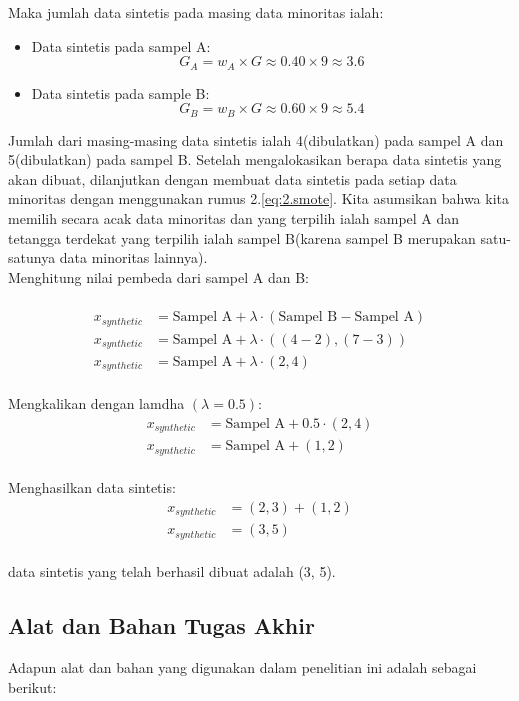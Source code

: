 Maka jumlah data sintetis pada masing data minoritas ialah:
\begin{itemize}
	\item Data sintetis pada sampel A:\\
		$$
			G_A = w_A \times G \approx 0.40 \times 9 \approx 3.6 
		$$
	\item Data sintetis pada sample B:\\
		$$
			G_B = w_B \times G \approx 0.60 \times 9 \approx 5.4 
		$$
\end{itemize}
Jumlah dari masing-masing data sintetis ialah 4(dibulatkan) pada sampel A dan 5(dibulatkan) pada sampel B. Setelah mengalokasikan berapa data sintetis yang akan dibuat, dilanjutkan dengan membuat data sintetis pada setiap data minoritas dengan menggunakan rumus 2.\ref{eq:2.smote}. Kita asumsikan bahwa kita memilih secara acak data minoritas dan yang terpilih ialah sampel A dan tetangga terdekat yang terpilih ialah sampel B(karena sampel B merupakan satu-satunya data minoritas lainnya).\\
Menghitung nilai pembeda dari sampel A dan B:\\
\\
\begin{align*}
    x_{synthetic} &= \text{Sampel A} + \lambda \cdot (\text{Sampel B} - \text{Sampel A})   \\
    x_{synthetic} &= \text{Sampel A} + \lambda \cdot ((4-2), (7-3)) \\
    x_{synthetic} &= \text{Sampel A} + \lambda \cdot (2,4) 
\end{align*}
\\
Mengkalikan dengan lamdha $(\lambda = 0.5)$:
\\
\begin{align*}
    x_{synthetic} &= \text{Sampel A} + 0.5 \cdot (2,4) \\ 
    x_{synthetic} &= \text{Sampel A} + (1,2) 
\end{align*}
\\
Menghasilkan data sintetis:
\\
\begin{align*}
    x_{synthetic} &= (2,3) + (1,2) \\
    x_{synthetic} &= (3, 5) 
\end{align*}
\\
data sintetis yang telah berhasil dibuat adalah (3, 5).
 



\subsection{Alat dan Bahan Tugas Akhir}
Adapun alat dan bahan yang digunakan dalam penelitian ini adalah sebagai berikut:
